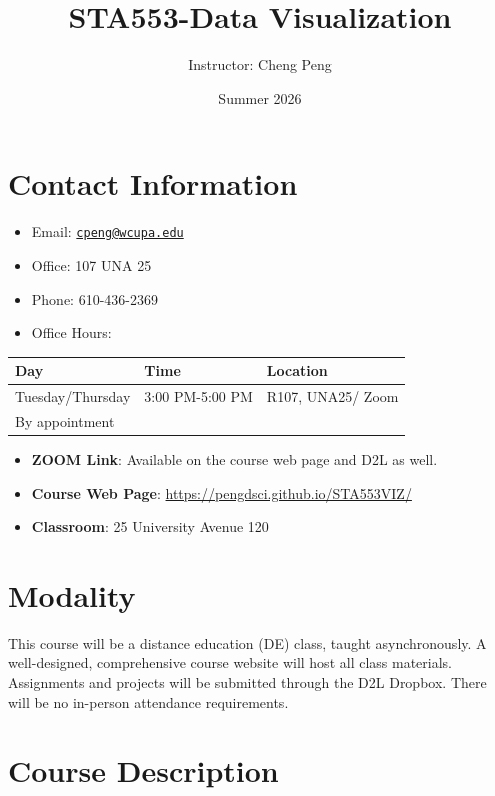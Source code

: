 \documentclass[
]{article}
\title{STA553-Data Visualization}
\author{Instructor: Cheng Peng}
\date{Summer 2026}
\providecommand{\tightlist}{%
  \setlength{\itemsep}{0pt}\setlength{\parskip}{0pt}}
\begin{document}
\maketitle

\hypertarget{contact-information}{%
\section{Contact Information}\label{contact-information}}

\begin{itemize}
\tightlist
\item
  Email: \href{mailto:cpeng@wcupa.edu}{\nolinkurl{cpeng@wcupa.edu}}
\item
  Office: 107 UNA 25
\item
  Phone: 610-436-2369
\item
  Office Hours:
\end{itemize}

\begin{longtable}[]{@{}lll@{}}
\toprule\noalign{}
Day & Time & Location \\
\midrule\noalign{}
\endhead
\bottomrule\noalign{}
\endlastfoot
Tuesday/Thursday & 3:00 PM-5:00 PM & R107, UNA25/ Zoom \\
By appointment & & \\
\end{longtable}

\begin{itemize}
\item
  \textbf{ZOOM Link}: Available on the course web page and D2L as well.
\item
  \textbf{Course Web Page}: \url{https://pengdsci.github.io/STA553VIZ/}
\item
  \textbf{Classroom}: 25 University Avenue 120
\end{itemize}

\hypertarget{modality}{%
\section{Modality}\label{modality}}

This course will be a distance education (DE) class, taught
asynchronously. A well-designed, comprehensive course website will host
all class materials. Assignments and projects will be submitted through
the D2L Dropbox. There will be no in-person attendance requirements.

\hypertarget{course-description}{%
\section{Course Description}\label{course-description}}
\end{document}
